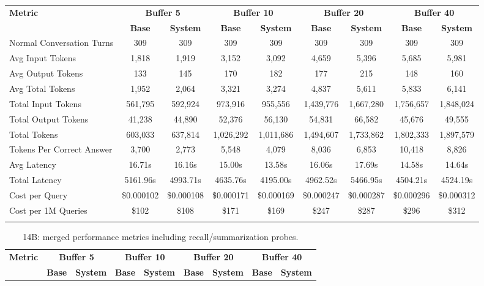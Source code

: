 \documentclass[pdflatex,sn-mathphys-num]{sn-jnl}%
\theoremstyle{thmstyleone}%
\theoremstyle{thmstyletwo}%
\theoremstyle{thmstylethree}%
\begin{document}
\begin{appendices}
\begin{landscape}
\begin{longtable}{@{}p{3.8cm}cccccccc@{}}
\toprule
\textbf{Metric} & \multicolumn{2}{c}{\textbf{Buffer 5}} & \multicolumn{2}{c}{\textbf{Buffer 10}} & \multicolumn{2}{c}{\textbf{Buffer 20}} & \multicolumn{2}{c}{\textbf{Buffer 40}} \\
\cmidrule(lr){2-3}\cmidrule(lr){4-5}\cmidrule(lr){6-7}\cmidrule(lr){8-9}
 & \textbf{Base} & \textbf{System} & \textbf{Base} & \textbf{System} & \textbf{Base} & \textbf{System} & \textbf{Base} & \textbf{System} \\
\midrule
\endhead
Normal Conversation Turns & 309 & 309 & 309 & 309 & 309 & 309 & 309 & 309 \\
Avg Input Tokens & 1,818 & 1,919 & 3,152 & 3,092 & 4,659 & 5,396 & 5,685 & 5,981 \\
Avg Output Tokens & 133 & 145 & 170 & 182 & 177 & 215 & 148 & 160 \\
Avg Total Tokens & 1,952 & 2,064 & 3,321 & 3,274 & 4,837 & 5,611 & 5,833 & 6,141 \\
Total Input Tokens & 561,795 & 592,924 & 973,916 & 955,556 & 1,439,776 & 1,667,280 & 1,756,657 & 1,848,024 \\
Total Output Tokens & 41,238 & 44,890 & 52,376 & 56,130 & 54,831 & 66,582 & 45,676 & 49,555 \\
Total Tokens & 603,033 & 637,814 & 1,026,292 & 1,011,686 & 1,494,607 & 1,733,862 & 1,802,333 & 1,897,579 \\
Tokens Per Correct Answer & 3,700 & 2,773 & 5,548 & 4,079 & 8,036 & 6,853 & 10,418 & 8,826 \\
Avg Latency & 16.71s & 16.16s & 15.00s & 13.58s & 16.06s & 17.69s & 14.58s & 14.64s \\
Total Latency & 5161.96s & 4993.71s & 4635.76s & 4195.00s & 4962.52s & 5466.95s & 4504.21s & 4524.19s \\
Cost per Query & \$0.000102 & \$0.000108 & \$0.000171 & \$0.000169 & \$0.000247 & \$0.000287 & \$0.000296 & \$0.000312 \\
Cost per 1M Queries & \$102 & \$108 & \$171 & \$169 & \$247 & \$287 & \$296 & \$312 \\
\botrule
\end{longtable}
\normalsize
\end{landscape}
\begin{landscape}
\tiny
\begin{longtable}{@{}p{3.8cm}cccccccc@{}}
\caption{14B: merged performance metrics including recall/summarization probes.}\label{tab:app_14b_perf_probe}\\

\toprule
\textbf{Metric} & \multicolumn{2}{c}{\textbf{Buffer 5}} & \multicolumn{2}{c}{\textbf{Buffer 10}} & \multicolumn{2}{c}{\textbf{Buffer 20}} & \multicolumn{2}{c}{\textbf{Buffer 40}} \\
\cmidrule(lr){2-3}\cmidrule(lr){4-5}\cmidrule(lr){6-7}\cmidrule(lr){8-9}
 & \textbf{Base} & \textbf{System} & \textbf{Base} & \textbf{System} & \textbf{Base} & \textbf{System} & \textbf{Base} & \textbf{System} \\
\midrule
\endfirsthead


\end{longtable}
\end{landscape}
\end{appendices}
\end{document}
